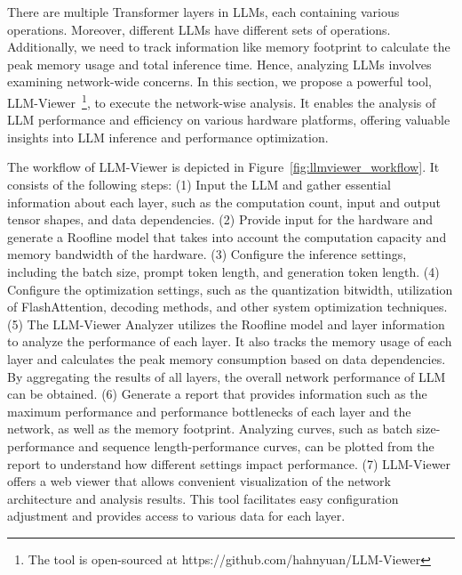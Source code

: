 
There are multiple Transformer layers in LLMs, each containing various operations. Moreover, different LLMs have different sets of operations. Additionally, we need to track information like memory footprint to calculate the peak memory usage and total inference time. Hence, analyzing LLMs involves examining network-wide concerns.
In this section, we propose a powerful tool, LLM-Viewer~\footnote{The tool is open-sourced at https://github.com/hahnyuan/LLM-Viewer}, to execute the network-wise analysis.
It enables the analysis of LLM performance and efficiency on various hardware platforms, offering valuable insights into LLM inference and performance optimization.

The workflow of LLM-Viewer is depicted in Figure~\ref{fig:llmviewer_workflow}. It consists of the following steps:
(1) Input the LLM and gather essential information about each layer, such as the computation count, input and output tensor shapes, and data dependencies.
(2) Provide input for the hardware and generate a Roofline model that takes into account the computation capacity and memory bandwidth of the hardware.
(3) Configure the inference settings, including the batch size, prompt token length, and generation token length.
(4) Configure the optimization settings, such as the quantization bitwidth, utilization of FlashAttention, decoding methods, and other system optimization techniques.
(5) The LLM-Viewer Analyzer utilizes the Roofline model and layer information to analyze the performance of each layer. It also tracks the memory usage of each layer and calculates the peak memory consumption based on data dependencies. By aggregating the results of all layers, the overall network performance of LLM can be obtained.
(6) Generate a report that provides information such as the maximum performance and performance bottlenecks of each layer and the network, as well as the memory footprint. Analyzing curves, such as batch size-performance and sequence length-performance curves, can be plotted from the report to understand how different settings impact performance.
(7) LLM-Viewer offers a web viewer that allows convenient visualization of the network architecture and analysis results. This tool facilitates easy configuration adjustment and provides access to various data for each layer.

